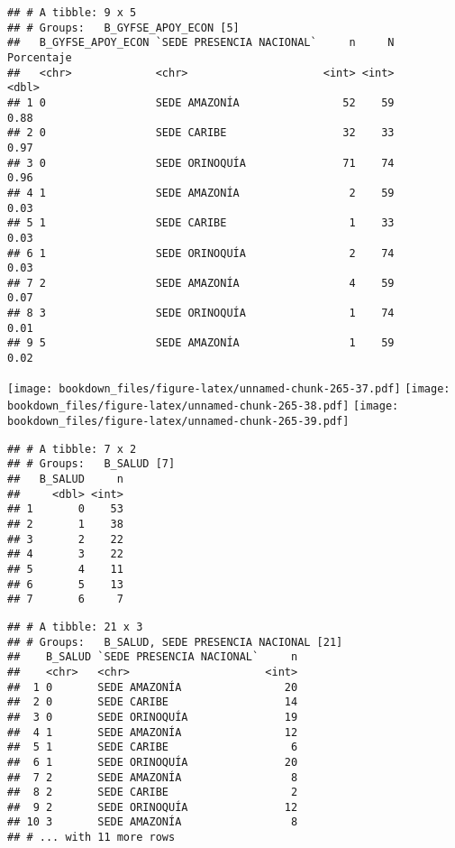 \documentclass[]{article}
\theoremstyle{definition}
\theoremstyle{definition}
\theoremstyle{definition}
\theoremstyle{remark}
\begin{document}
\begin{verbatim}
## # A tibble: 9 x 5
## # Groups:   B_GYFSE_APOY_ECON [5]
##   B_GYFSE_APOY_ECON `SEDE PRESENCIA NACIONAL`     n     N Porcentaje
##   <chr>             <chr>                     <int> <int>      <dbl>
## 1 0                 SEDE AMAZONÍA                52    59       0.88
## 2 0                 SEDE CARIBE                  32    33       0.97
## 3 0                 SEDE ORINOQUÍA               71    74       0.96
## 4 1                 SEDE AMAZONÍA                 2    59       0.03
## 5 1                 SEDE CARIBE                   1    33       0.03
## 6 1                 SEDE ORINOQUÍA                2    74       0.03
## 7 2                 SEDE AMAZONÍA                 4    59       0.07
## 8 3                 SEDE ORINOQUÍA                1    74       0.01
## 9 5                 SEDE AMAZONÍA                 1    59       0.02
\end{verbatim}

\texttt{[image: bookdown\_files/figure-latex/unnamed-chunk-265-37.pdf]}
\texttt{[image: bookdown\_files/figure-latex/unnamed-chunk-265-38.pdf]}
\texttt{[image: bookdown\_files/figure-latex/unnamed-chunk-265-39.pdf]}

\begin{verbatim}
## # A tibble: 7 x 2
## # Groups:   B_SALUD [7]
##   B_SALUD     n
##     <dbl> <int>
## 1       0    53
## 2       1    38
## 3       2    22
## 4       3    22
## 5       4    11
## 6       5    13
## 7       6     7
\end{verbatim}

\begin{verbatim}
## # A tibble: 21 x 3
## # Groups:   B_SALUD, SEDE PRESENCIA NACIONAL [21]
##    B_SALUD `SEDE PRESENCIA NACIONAL`     n
##    <chr>   <chr>                     <int>
##  1 0       SEDE AMAZONÍA                20
##  2 0       SEDE CARIBE                  14
##  3 0       SEDE ORINOQUÍA               19
##  4 1       SEDE AMAZONÍA                12
##  5 1       SEDE CARIBE                   6
##  6 1       SEDE ORINOQUÍA               20
##  7 2       SEDE AMAZONÍA                 8
##  8 2       SEDE CARIBE                   2
##  9 2       SEDE ORINOQUÍA               12
## 10 3       SEDE AMAZONÍA                 8
## # ... with 11 more rows
\end{verbatim}
\end{document}
